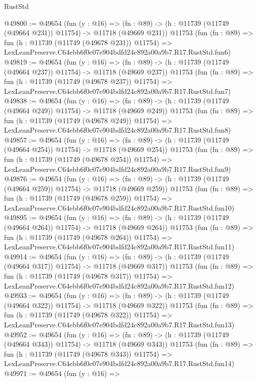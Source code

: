 \begin{lexlean}{RustStd}
\begin{coremodule}
@49800 := @49654
    (fun (y : @16) =>
    (fn : @89) -> (h : @11739 (@11749 (@49664 @231)) @11754) -> @11718 (@49669 @231))
    @11753
    (fun (fn : @89) =>
    fun (h : @11739 (@11749 (@49678 @231)) @11754) =>
    LexLeanPreserve.C64ebb6f0c07e904bdfd24c892a00a9b7.R17.RustStd.fun6)
@49819 := @49654
    (fun (y : @16) =>
    (fn : @89) -> (h : @11739 (@11749 (@49664 @237)) @11754) -> @11718 (@49669 @237))
    @11753
    (fun (fn : @89) =>
    fun (h : @11739 (@11749 (@49678 @237)) @11754) =>
    LexLeanPreserve.C64ebb6f0c07e904bdfd24c892a00a9b7.R17.RustStd.fun7)
@49838 := @49654
    (fun (y : @16) =>
    (fn : @89) -> (h : @11739 (@11749 (@49664 @249)) @11754) -> @11718 (@49669 @249))
    @11753
    (fun (fn : @89) =>
    fun (h : @11739 (@11749 (@49678 @249)) @11754) =>
    LexLeanPreserve.C64ebb6f0c07e904bdfd24c892a00a9b7.R17.RustStd.fun8)
@49857 := @49654
    (fun (y : @16) =>
    (fn : @89) -> (h : @11739 (@11749 (@49664 @254)) @11754) -> @11718 (@49669 @254))
    @11753
    (fun (fn : @89) =>
    fun (h : @11739 (@11749 (@49678 @254)) @11754) =>
    LexLeanPreserve.C64ebb6f0c07e904bdfd24c892a00a9b7.R17.RustStd.fun9)
@49876 := @49654
    (fun (y : @16) =>
    (fn : @89) -> (h : @11739 (@11749 (@49664 @259)) @11754) -> @11718 (@49669 @259))
    @11753
    (fun (fn : @89) =>
    fun (h : @11739 (@11749 (@49678 @259)) @11754) =>
    LexLeanPreserve.C64ebb6f0c07e904bdfd24c892a00a9b7.R17.RustStd.fun10)
@49895 := @49654
    (fun (y : @16) =>
    (fn : @89) -> (h : @11739 (@11749 (@49664 @264)) @11754) -> @11718 (@49669 @264))
    @11753
    (fun (fn : @89) =>
    fun (h : @11739 (@11749 (@49678 @264)) @11754) =>
    LexLeanPreserve.C64ebb6f0c07e904bdfd24c892a00a9b7.R17.RustStd.fun11)
@49914 := @49654
    (fun (y : @16) =>
    (fn : @89) -> (h : @11739 (@11749 (@49664 @317)) @11754) -> @11718 (@49669 @317))
    @11753
    (fun (fn : @89) =>
    fun (h : @11739 (@11749 (@49678 @317)) @11754) =>
    LexLeanPreserve.C64ebb6f0c07e904bdfd24c892a00a9b7.R17.RustStd.fun12)
@49933 := @49654
    (fun (y : @16) =>
    (fn : @89) -> (h : @11739 (@11749 (@49664 @322)) @11754) -> @11718 (@49669 @322))
    @11753
    (fun (fn : @89) =>
    fun (h : @11739 (@11749 (@49678 @322)) @11754) =>
    LexLeanPreserve.C64ebb6f0c07e904bdfd24c892a00a9b7.R17.RustStd.fun13)
@49952 := @49654
    (fun (y : @16) =>
    (fn : @89) -> (h : @11739 (@11749 (@49664 @343)) @11754) -> @11718 (@49669 @343))
    @11753
    (fun (fn : @89) =>
    fun (h : @11739 (@11749 (@49678 @343)) @11754) =>
    LexLeanPreserve.C64ebb6f0c07e904bdfd24c892a00a9b7.R17.RustStd.fun14)
@49971 := @49654
    (fun (y : @16) =>

\end{coremodule}
\end{lexlean}
